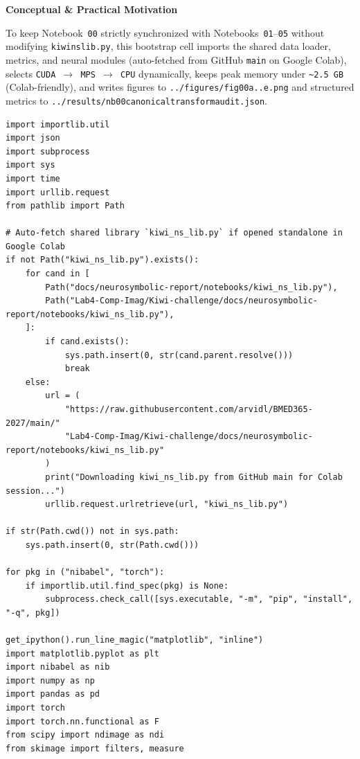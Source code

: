 \documentclass[10pt,a4paper]{article}
\renewcommand{\_}{\origunderscore\allowbreak}
\begin{document}
\begin{guidehdr}
{\small\bfseries\color{kiwigreen!75!black}Conceptual \& Practical Motivation}
\end{guidehdr}
To keep Notebook~\texttt{00} strictly synchronized with Notebooks~\texttt{01}--\texttt{05} without modifying \texttt{kiwi\_ns\_lib.py}, this bootstrap cell imports the shared data loader, metrics, and neural modules (auto-fetched from GitHub \texttt{main} on Google Colab), selects \texttt{CUDA $\to$ MPS $\to$ CPU} dynamically, keeps peak memory under \texttt{\textasciitilde{}2.5 GB} (Colab-friendly), and writes figures to \texttt{../\allowbreak{}figures/\allowbreak{}fig00a..e\_*.png} and structured metrics to \texttt{../\allowbreak{}results/\allowbreak{}nb00\_canonical\_transform\_audit.json}.

\begin{codebox}
\begin{lstlisting}[style=pybmed]
import importlib.util
import json
import subprocess
import sys
import time
import urllib.request
from pathlib import Path

# Auto-fetch shared library `kiwi_ns_lib.py` if opened standalone in Google Colab
if not Path("kiwi_ns_lib.py").exists():
    for cand in [
        Path("docs/neurosymbolic-report/notebooks/kiwi_ns_lib.py"),
        Path("Lab4-Comp-Imag/Kiwi-challenge/docs/neurosymbolic-report/notebooks/kiwi_ns_lib.py"),
    ]:
        if cand.exists():
            sys.path.insert(0, str(cand.parent.resolve()))
            break
    else:
        url = (
            "https://raw.githubusercontent.com/arvidl/BMED365-2027/main/"
            "Lab4-Comp-Imag/Kiwi-challenge/docs/neurosymbolic-report/notebooks/kiwi_ns_lib.py"
        )
        print("Downloading kiwi_ns_lib.py from GitHub main for Colab session...")
        urllib.request.urlretrieve(url, "kiwi_ns_lib.py")

if str(Path.cwd()) not in sys.path:
    sys.path.insert(0, str(Path.cwd()))

for pkg in ("nibabel", "torch"):
    if importlib.util.find_spec(pkg) is None:
        subprocess.check_call([sys.executable, "-m", "pip", "install", "-q", pkg])

get_ipython().run_line_magic("matplotlib", "inline")
import matplotlib.pyplot as plt
import nibabel as nib
import numpy as np
import pandas as pd
import torch
import torch.nn.functional as F
from scipy import ndimage as ndi
from skimage import filters, measure


\end{lstlisting}
\end{codebox}
\end{document}
